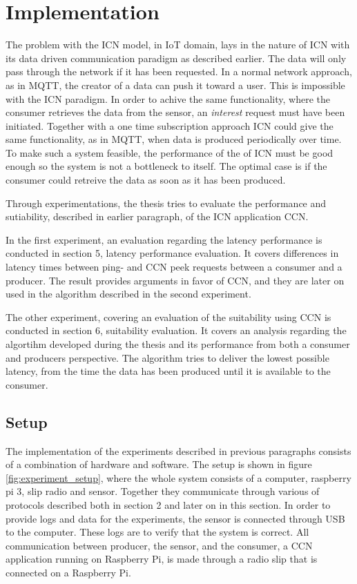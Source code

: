 \section{Implementation}
The problem with the ICN model, in IoT domain, lays in the nature of ICN with its data driven communication paradigm as described earlier. The data will only pass through the network if it has been requested. In a normal network approach, as in MQTT, the creator of a data can push it toward a user. This is impossible with the ICN paradigm. 
In order to achive the same functionality, where the consumer retrieves the data from the sensor, an \textit{interest} request must have been initiated. Together with a one time subscription approach ICN could give the same functionality, as in MQTT, when data is produced periodically over time. To make such a system feasible, the performance of the of ICN must be good enough so the system is not a bottleneck to itself. The optimal case is if the consumer could retreive the data as soon as it has been produced.

Through experimentations, the thesis tries to evaluate the performance and sutiability, described in earlier paragraph, of the ICN application CCN.

In the first experiment, an evaluation regarding the latency performance is conducted in section 5, latency performance evaluation. It covers differences in latency times between ping- and CCN peek requests between a consumer and a producer. The result provides arguments in favor of CCN, and they are later on used in the algorithm described in the second experiment.

The other experiment, covering an evaluation of the suitability using CCN is conducted in section 6, suitability evaluation. It covers an analysis regarding the algortihm developed during the thesis and its performance from both a consumer and producers perspective. The algorithm tries to deliver the lowest possible latency, from the time the data has been produced until it is available to the consumer. 


\subsection{Setup}
The implementation of the experiments described in previous paragraphs consists of a combination of hardware and software. The setup is shown in figure \ref{fig:experiment_setup}, where the whole system consists of a computer, raspberry pi 3, slip radio and sensor. Together they communicate through various of protocols described both in section 2 and later on in this section. 
In order to provide logs and data for the experiments, the sensor is connected through USB to the computer. These logs are to verify that the system is correct. All communication between producer, the sensor, and the consumer, a CCN application running on Raspberry Pi, is made through a radio slip that is connected on a Raspberry Pi.

